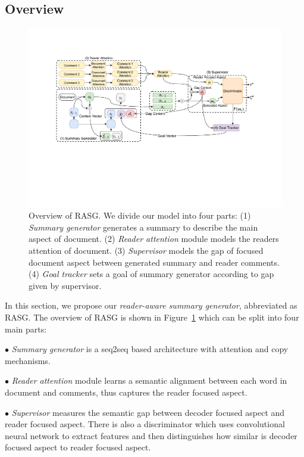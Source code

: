 \documentclass[letterpaper]{article} %
\begin{document}
\subsection{Overview}

\begin{figure}
    \centering
    \includegraphics[scale=0.66]{figs/weibo.pdf}
    \caption{Overview of RASG. We divide our model into four parts: (1) \textit{Summary generator} generates a summary to describe the main aspect of document. (2) \textit{Reader attention} module models the readers attention of document. (3) \textit{Supervisor} models the gap of focused document aspect between generated summary and reader comments. (4) \textit{Goal tracker} sets a goal of summary generator according to gap given by supervisor. 
    }
    \label{fig:overview}
\end{figure}

In this section, we propose our \emph{reader-aware summary generator}, abbreviated as RASG. 
The overview of RASG is shown in Figure~\ref{fig:overview} which can be split into four main parts:

$\bullet$ \textit{Summary generator} is a seq2seq based architecture with attention and copy mechanisms.

$\bullet$ \textit{Reader attention} module learns a semantic alignment between each word in document and comments, thus captures the reader focused aspect.

$\bullet$ \textit{Supervisor} measures the semantic gap between decoder focused aspect and reader focused aspect.
There is also a discriminator which uses convolutional neural network to extract features and then distinguishes how similar is decoder focused aspect to reader focused aspect.
\end{document}
